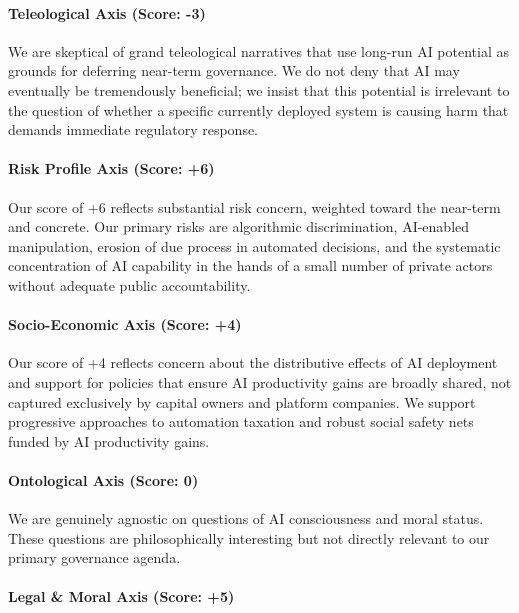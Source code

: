 \paragraph{Teleological Axis (Score:
-3)}\label{teleological-axis-score--3}

We are skeptical of grand teleological narratives that use long-run AI
potential as grounds for deferring near-term governance. We do not deny
that AI may eventually be tremendously beneficial; we insist that this
potential is irrelevant to the question of whether a specific currently
deployed system is causing harm that demands immediate regulatory
response.

\paragraph{Risk Profile Axis (Score:
+6)}\label{risk-profile-axis-score-6-1}

Our score of +6 reflects substantial risk concern, weighted toward the
near-term and concrete. Our primary risks are algorithmic
discrimination, AI-enabled manipulation, erosion of due process in
automated decisions, and the systematic concentration of AI capability
in the hands of a small number of private actors without adequate public
accountability.

\paragraph{Socio-Economic Axis (Score:
+4)}\label{socio-economic-axis-score-4}

Our score of +4 reflects concern about the distributive effects of AI
deployment and support for policies that ensure AI productivity gains
are broadly shared, not captured exclusively by capital owners and
platform companies. We support progressive approaches to automation
taxation and robust social safety nets funded by AI productivity gains.

\paragraph{Ontological Axis (Score:
0)}\label{ontological-axis-score-0-1}

We are genuinely agnostic on questions of AI consciousness and moral
status. These questions are philosophically interesting but not directly
relevant to our primary governance agenda.

\paragraph{Legal \& Moral Axis (Score:
+5)}\label{legal-moral-axis-score-5-1}

